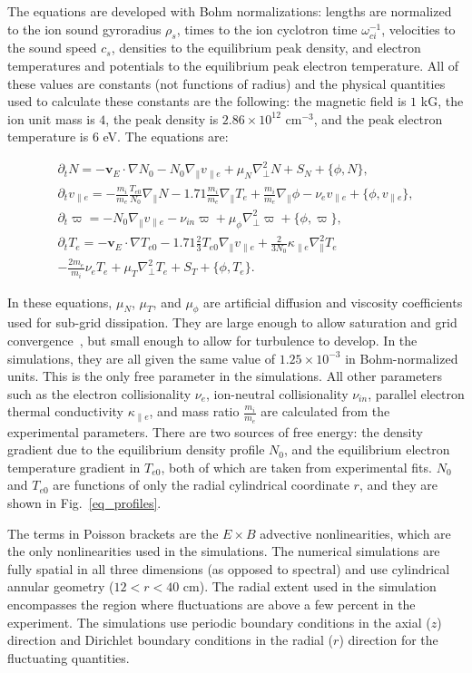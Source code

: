 \documentclass[showpacs,preprintnumbers,amsmath,amssymb,superscriptaddress,aip]{revtex4-1}
\def\beqar{\begin{eqnarray}}
\def\eeqar{\end{eqnarray}}
\newcommand{\pdt}{\partial_t}
\def\grad{\nabla}
\newcommand{\gradpar}{\grad_\parallel}
\newcommand{\gradperp}{\grad_\perp}
\newcommand{\vpe}{v_{\parallel e}}
\newcommand{\nue}{\nu_{e}}
\newcommand{\nuin}{\nu_{in}}
\newcommand{\kpe}{\kappa_{\parallel e}}
\newcommand{\fmie}{\frac{m_i}{m_e}}
\begin{document}
The equations are developed with Bohm normalizations: lengths are
normalized to the ion sound gyroradius $\rho_s$, times to the ion
cyclotron time $\omega_{ci}^{-1}$, velocities to the sound speed $c_s$, densities to the equilibrium peak density, and electron
temperatures and potentials to the equilibrium peak electron temperature. All of these values are constants (not functions of radius) and the physical quantities used to calculate 
these constants are the following: the magnetic field is $1$ kG, the ion unit mass is $4$, the peak density is $2.86 \times 10^{12}$ cm$^{-3}$, and the peak electron temperature
is $6$ eV. The equations are:

\beqar
\label{ni_eq}
\pdt N = - {\mathbf v_E} \cdot \grad N_0 - N_0 \gradpar \vpe + \mu_N \gradperp^2 N + S_N + \{\phi,N\}, \\
\label{ve_eq}
\pdt \vpe = - \fmie \frac{T_{e0}}{N_0} \gradpar N - 1.71 \fmie \gradpar T_e  + \fmie \gradpar \phi - \nue \vpe + \{\phi,\vpe \}, \\
\label{rho_eq}
\pdt \varpi = - N_0 \gradpar \vpe  - \nuin \varpi + \mu_\phi \gradperp^2 \varpi + \{\phi,\varpi \}, \\
\label{te_eq}
\pdt T_e = - {\mathbf v_E} \cdot \grad T_{e0} - 1.71 \frac{2}{3} T_{e0} \gradpar \vpe + \frac{2}{3 N_0} \kpe \gradpar^2 T_e  \nonumber \\
- \frac{2 m_e}{m_i} \nue T_e  + \mu_T \gradperp^2 T_e +  S_T + \{\phi,T_e\}.
\eeqar

In these equations, $\mu_N$, $\mu_T$, and $\mu_\phi$ are artificial diffusion and viscosity coefficients used for sub-grid dissipation. They are large enough to allow saturation
and grid convergence~\cite{friedman2012}, but small enough to allow for turbulence to develop. In the simulations, they are all given the same value of $1.25 \times 10^{-3}$ in Bohm-normalized units. 
This is the only free parameter in the simulations. All other parameters such as the electron collisionality $\nue$, ion-neutral
collisionality $\nuin$, parallel electron thermal conductivity $\kpe$, and mass ratio $\fmie$ are calculated from the experimental parameters.
There are two sources of free energy: the density gradient due to the equilibrium density profile $N_0$, and the equilibrium electron temperature gradient in $T_{e0}$, both of which are
taken from experimental fits. $N_0$ and $T_{e0}$ are functions of only the radial cylindrical coordinate $r$, and they are shown in Fig.~\ref{eq_profiles}. 

The terms in Poisson brackets are the $E \times B$ advective nonlinearities, which are the only nonlinearities used in the simulations.
The numerical simulations are fully spatial in all three dimensions (as opposed to spectral) and use cylindrical annular geometry ($12<r<40$ cm). The radial extent used in the simulation
encompasses the region where fluctuations are above a few percent in the experiment.
The simulations use periodic boundary conditions in the axial ($z$) direction and Dirichlet boundary
conditions in the radial ($r$) direction for the fluctuating quantities. 
\end{document}
